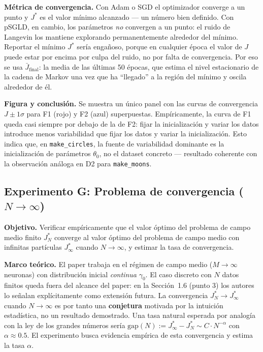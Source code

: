 \documentclass[11pt, a4paper]{article}
\theoremstyle{definition}
\begin{document}
\textbf{Métrica de convergencia.} Con Adam o SGD el optimizador converge a un
punto y $J^*$ es el valor mínimo alcanzado — un número bien definido.
Con pSGLD, en cambio, los parámetros \emph{no} convergen a un punto: el ruido
de Langevin los mantiene explorando permanentemente alrededor del mínimo.
Reportar el mínimo $J^*$ sería engañoso, porque en cualquier época el valor
de $J$ puede estar por encima por culpa del ruido, no por falta de convergencia.
Por eso se usa $\bar{J}_\text{final}$: la media de las últimas 50 épocas,
que estima el nivel estacionario de la cadena de Markov una vez que ha
``llegado'' a la región del mínimo y oscila alrededor de él.

\textbf{Figura y conclusión.} Se muestra un único panel con las curvas de
convergencia $J \pm 1\sigma$ para F1 (rojo) y F2 (azul) superpuestas.
Empíricamente, la curva de F1 queda casi siempre por debajo de la de F2:
fijar la inicialización y variar los datos introduce menos variabilidad
que fijar los datos y variar la inicialización. Esto indica que, en
\texttt{make\_circles}, la fuente de variabilidad dominante es la
inicialización de parámetros $\theta_0$, no el dataset concreto — resultado
coherente con la observación análoga en D2 para \texttt{make\_moons}.

\subsection{Experimento G: Problema de convergencia ($N \to \infty$)}

\textbf{Objetivo.} Verificar empíricamente que el valor óptimo del problema
de campo medio finito $J^*_N$ converge al valor óptimo del problema de campo
medio con infinitas partículas $J^*_\infty$ cuando $N \to \infty$, y estimar
la tasa de convergencia.

\textbf{Marco teórico.} El paper \cite{daudin2025} trabaja en el régimen de
campo medio ($M \to \infty$ neuronas) con distribución inicial \emph{continua}
$\gamma_0$. El caso discreto con $N$ datos finitos queda fuera del alcance
del paper: en la Sección~1.6 (punto 3) los autores lo señalan explícitamente
como extensión futura. La convergencia $J^*_N \to J^*_\infty$ cuando
$N \to \infty$ es por tanto una \textbf{conjetura} motivada por la intuición
estadística, no un resultado demostrado. Una tasa natural esperada por
analogía con la ley de los grandes números sería
$\text{gap}(N) := J^*_\infty - J^*_N \sim C \cdot N^{-\alpha}$ con
$\alpha \approx 0.5$. El experimento busca evidencia empírica de esta
convergencia y estima la tasa $\alpha$.
\end{document}
